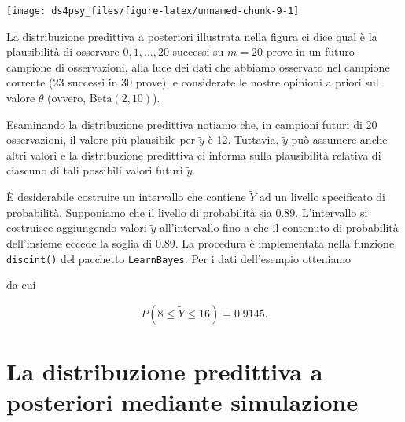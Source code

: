 \documentclass[
  11pt,
]{krantz}
\makeatletter
\newenvironment{Shaded}{\begin{snugshade}}{\end{snugshade}}
\newcommand{\CommentTok}[1]{\textcolor[rgb]{0.37,0.37,0.37}{\textit{#1}}}
\newcommand{\DecValTok}[1]{\textcolor[rgb]{0.06,0.06,0.06}{#1}}
\newcommand{\FloatTok}[1]{\textcolor[rgb]{0.06,0.06,0.06}{#1}}
\newcommand{\FunctionTok}[1]{\textcolor[rgb]{0,0,0}{#1}}
\newcommand{\NormalTok}[1]{#1}
\newcommand{\SpecialCharTok}[1]{\textcolor[rgb]{0,0,0}{#1}}
\newenvironment{kframe}{%
\medskip{}
\setlength{\fboxsep}{.8em}
 \def\at@end@of@kframe{}%
 \ifinner\ifhmode%
  \def\at@end@of@kframe{\end{minipage}}%
  \begin{minipage}{\columnwidth}%
 \fi\fi%
 \def\FrameCommand##1{\hskip\@totalleftmargin \hskip-\fboxsep
 \colorbox{shadecolor}{##1}\hskip-\fboxsep
     \hskip-\linewidth \hskip-\@totalleftmargin \hskip\columnwidth}%
 \MakeFramed {\advance\hsize-\width
   \@totalleftmargin\z@ \linewidth\hsize
   \@setminipage}}%
 {\par\unskip\endMakeFramed%
 \at@end@of@kframe}
\renewenvironment{Shaded}{\begin{kframe}}{\end{kframe}}
\theoremstyle{definition}
\theoremstyle{definition}
\theoremstyle{definition}
\theoremstyle{definition}
\theoremstyle{remark}
\makeatother
\begin{document}
\begin{center}\texttt{[image: ds4psy\_files/figure-latex/unnamed-chunk-9-1]} \end{center}

La distribuzione predittiva a posteriori illustrata nella figura ci dice qual è la plausibilità di osservare \(0, 1, \dots, 20\) successi su \(m = 20\) prove in un futuro campione di osservazioni, alla luce dei dati che abbiamo osservato nel campione corrente (23 successi in 30 prove), e considerate le nostre opinioni a priori sul valore \(\theta\) (ovvero, \(\mbox{Beta}(2, 10)\)).

Esaminando la distribuzione predittiva notiamo che, in campioni futuri di 20 osservazioni, il valore più plausibile per \(\tilde{y}\) è 12. Tuttavia, \(\tilde{y}\) può assumere anche altri valori e la distribuzione predittiva ci informa sulla plausibilità relativa di ciascuno di tali possibili valori futuri \(\tilde{y}\).

È desiderabile costruire un intervallo che contiene \(\tilde{Y}\) ad un livello specificato di probabilità. Supponiamo che il livello di probabilità sia 0.89. L'intervallo si costruisce aggiungendo valori \(\tilde{y}\) all'intervallo fino a che il contenuto di probabilità dell'insieme eccede la soglia di 0.89. La procedura è implementata nella funzione \texttt{discint()} del pacchetto \texttt{LearnBayes}. Per i dati dell'esempio otteniamo

\begin{Shaded}
\end{Shaded}

da cui

\[
P(8 \leq \tilde{Y} \leq 16) = 0.9145.
\]

\hypertarget{la-distribuzione-predittiva-a-posteriori-mediante-simulazione}{%
\section{La distribuzione predittiva a posteriori mediante simulazione}\label{la-distribuzione-predittiva-a-posteriori-mediante-simulazione}}
\end{document}
